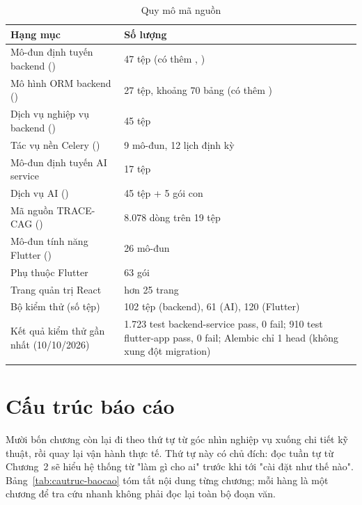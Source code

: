 \begin{longtable}{L{7.2cm} L{6.4cm}}
\toprule
\textbf{Hạng mục} & \textbf{Số lượng}\\
\midrule
\endhead
Mô-đun định tuyến backend () & 47 tệp (có thêm , )\\
Mô hình ORM backend () & 27 tệp, khoảng 70 bảng (có thêm )\\
Dịch vụ nghiệp vụ backend () & 45 tệp\\
Tác vụ nền Celery () & 9 mô-đun, 12 lịch định kỳ\\
Mô-đun định tuyến AI service & 17 tệp\\
Dịch vụ AI () & 45 tệp + 5 gói con\\
Mã nguồn TRACE-CAG () & 8.078 dòng trên 19 tệp\\
Mô-đun tính năng Flutter () & 26 mô-đun\\
Phụ thuộc Flutter & 63 gói\\
Trang quản trị React & hơn 25 trang\\
Bộ kiểm thử (số tệp) & 102 tệp (backend), 61 (AI), 120 (Flutter)\\
Kết quả kiểm thử gần nhất (10/10/2026) & 1.723 test backend-service pass, 0 fail; 910 test flutter-app pass, 0 fail; Alembic chỉ 1 head (không xung đột migration)\\
\bottomrule
\caption{Quy mô mã nguồn}
\end{longtable}

\section{Cấu trúc báo cáo}

Mười bốn chương còn lại đi theo thứ tự từ góc nhìn nghiệp vụ xuống chi tiết kỹ thuật, rồi
quay lại vận hành thực tế. Thứ tự này có chủ đích: đọc tuần tự từ Chương~2 sẽ hiểu hệ
thống từ "làm gì cho ai" trước khi tới "cài đặt như thế nào". Bảng~\ref{tab:cautruc-baocao}
tóm tắt nội dung từng chương; mỗi hàng là một chương để tra cứu nhanh không phải đọc lại
toàn bộ đoạn văn.

